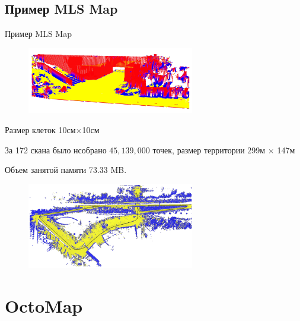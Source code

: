 \documentclass[9pt]{beamer}
\begin{document}
\subsection{Пример MLS Map}
\begin{frame}{Пример MLS Map}

\begin{figure}[h]
    \centering
    \includegraphics[width=0.65\textwidth]{mls_m.png}
\end{figure}

Размер клеток 10см$\times$10см

За 172 скана было нсобрано $45,139,000$ точек, размер территории 299м $\times$ 147м

Объем занятой памяти 73.33 MB.

\begin{figure}[h]
    \centering
    \includegraphics[width=0.65\textwidth]{mls_g.png}
\end{figure}


\end{frame}

\section{OctoMap}
\end{document}
